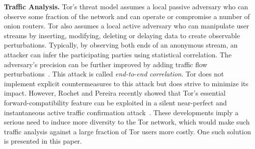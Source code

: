 

\textbf{Traffic Analysis.}
Tor's threat model assumes a local passive adversary who can observe some fraction of
the network and can operate or compromise a number of onion routers. Tor also
assumes a local active adversary who can manipulate user streams by inserting,
modifying, deleting or delaying data to create observable perturbations.
Typically, by observing both ends of an anonymous stream, an attacker can infer
the participating parties using statistical correlation. The adversary's
precision can be further improved by adding traffic flow
perturbations~\cite{fu2009one}. This attack is called \textit{end-to-end
  correlation}. Tor does not implement explicit countermeasures to this attack
but does strive to minimize its impact. However, Rochet and Pereira recently
showed that Tor's essential forward-compatibility feature can be exploited in a
silent near-perfect and instantaneous active traffic confirmation
attack~\cite{rochet2018dropping}. These developments imply a serious need to
induce more diversity to the Tor network, which would make such traffic analysis
against a large fraction of Tor users more costly. One such solution is
presented in this paper.

